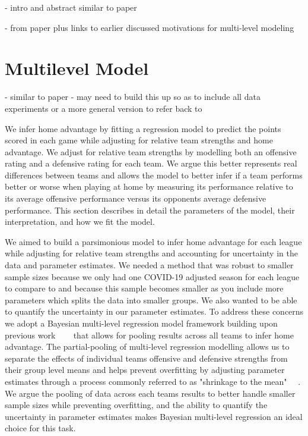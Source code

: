 - intro and abstract similar to paper

- from paper plus links to earlier discussed motivations for multi-level modeling

\section{Multilevel Model}

- similar to paper
- may need to build this up so as to include all data experiments or a more general version to refer back to

We infer home advantage by fitting a regression model to predict the points scored in each game while adjusting for relative team strengths and home advantage. We adjust for relative team strengths by modelling both an offensive rating and a defensive rating for each team. We argue this better represents real differences between teams and allows the model to better infer if a team performs better or worse when playing at home by measuring its performance relative to its average offensive performance versus its opponents average defensive performance. This section describes in detail the parameters of the model, their interpretation, and how we fit the model.

We aimed to build a parsimonious model to infer home advantage for each league while adjusting for relative team strengths and accounting for uncertainty in the data and parameter estimates. We needed a method that was robust to smaller sample sizes because we only had one COVID-19 adjusted season for each league to compare to and because this sample becomes smaller as you include more parameters which splits the data into smaller groups. We also wanted to be able to quantify the uncertainty in our parameter estimates. To address these concerns we adopt a Bayesian multi-level regression model framework building upon previous work \mbox{\cite{Baio2010} \cite{Glickman1998} \cite{Lopez2018} \cite{Benz2020}} that allows for pooling results across all teams to infer home advantage. The partial-pooling of multi-level regression modelling allows us to separate the effects of individual teams offensive and defensive strengths from their group level means and helps prevent overfitting by adjusting parameter estimates through a process commonly referred to as "shrinkage to the mean" \mbox{\cite{Gelman2014} \cite{Gelman2006} \cite{McElreath2020}}. We argue the pooling of data across each teams results to better handle smaller sample sizes while preventing overfitting, and the ability to quantify the uncertainty in parameter estimates makes Bayesian multi-level regression an ideal choice for this task.

